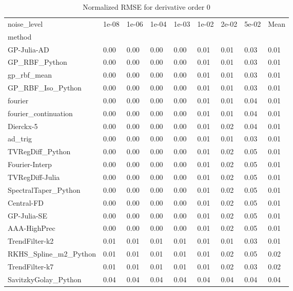 \begin{table}
\caption{Normalized RMSE for derivative order 0}
\label{tab:nrmse_order_0}
\begin{tabular}{lllllllll}
\toprule
noise_level & 1e-08 & 1e-06 & 1e-04 & 1e-03 & 1e-02 & 2e-02 & 5e-02 & Mean \\
method &  &  &  &  &  &  &  &  \\
\midrule
GP-Julia-AD & 0.00 & 0.00 & 0.00 & 0.00 & 0.01 & 0.01 & 0.03 & 0.01 \\
GP_RBF_Python & 0.00 & 0.00 & 0.00 & 0.00 & 0.01 & 0.01 & 0.03 & 0.01 \\
gp_rbf_mean & 0.00 & 0.00 & 0.00 & 0.00 & 0.01 & 0.01 & 0.03 & 0.01 \\
GP_RBF_Iso_Python & 0.00 & 0.00 & 0.00 & 0.00 & 0.01 & 0.01 & 0.03 & 0.01 \\
fourier & 0.00 & 0.00 & 0.00 & 0.00 & 0.01 & 0.01 & 0.04 & 0.01 \\
fourier_continuation & 0.00 & 0.00 & 0.00 & 0.00 & 0.01 & 0.01 & 0.04 & 0.01 \\
Dierckx-5 & 0.00 & 0.00 & 0.00 & 0.00 & 0.01 & 0.02 & 0.04 & 0.01 \\
ad_trig & 0.00 & 0.00 & 0.00 & 0.00 & 0.01 & 0.01 & 0.03 & 0.01 \\
TVRegDiff_Python & 0.00 & 0.00 & 0.00 & 0.00 & 0.01 & 0.02 & 0.05 & 0.01 \\
Fourier-Interp & 0.00 & 0.00 & 0.00 & 0.00 & 0.01 & 0.02 & 0.05 & 0.01 \\
TVRegDiff-Julia & 0.00 & 0.00 & 0.00 & 0.00 & 0.01 & 0.02 & 0.05 & 0.01 \\
SpectralTaper_Python & 0.00 & 0.00 & 0.00 & 0.00 & 0.01 & 0.02 & 0.05 & 0.01 \\
Central-FD & 0.00 & 0.00 & 0.00 & 0.00 & 0.01 & 0.02 & 0.05 & 0.01 \\
GP-Julia-SE & 0.00 & 0.00 & 0.00 & 0.00 & 0.01 & 0.02 & 0.05 & 0.01 \\
AAA-HighPrec & 0.00 & 0.00 & 0.00 & 0.00 & 0.01 & 0.02 & 0.05 & 0.01 \\
TrendFilter-k2 & 0.01 & 0.01 & 0.01 & 0.01 & 0.01 & 0.01 & 0.03 & 0.01 \\
RKHS_Spline_m2_Python & 0.01 & 0.01 & 0.01 & 0.01 & 0.01 & 0.02 & 0.05 & 0.02 \\
TrendFilter-k7 & 0.01 & 0.01 & 0.01 & 0.01 & 0.01 & 0.02 & 0.03 & 0.02 \\
SavitzkyGolay_Python & 0.04 & 0.04 & 0.04 & 0.04 & 0.04 & 0.04 & 0.04 & 0.04 \\

\end{tabular}
\end{table}
